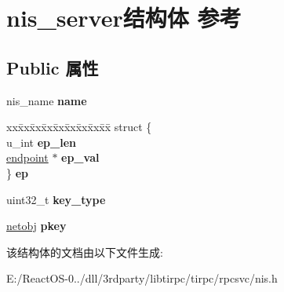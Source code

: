 \hypertarget{structnis__server}{}\section{nis\+\_\+server结构体 参考}
\label{structnis__server}
\subsection*{Public 属性}
\begin{DoxyCompactItemize}
\item 
\mbox{\label{structnis__server_ad0a723ac45ea66369ce09b6cb729c4ed}} 
nis\+\_\+name {\bfseries name}
\item 
\mbox{\label{structnis__server_a392a344888cf3b884c85b5b671d7b2d9}} 
\begin{tabbing}
xx\=xx\=xx\=xx\=xx\=xx\=xx\=xx\=xx\=\kill
struct \{\\
\>u\_int {\bfseries ep\_len}\\
\>\hyperlink{structendpoint}{endpoint} $\ast$ {\bfseries ep\_val}\\
\} {\bfseries ep}\\

\end{tabbing}\item 
\mbox{\label{structnis__server_a06609914e33ad4ca10f3ae3d272e9709}} 
uint32\+\_\+t {\bfseries key\+\_\+type}
\item 
\mbox{\label{structnis__server_a7a0462cb3c7045c6484e07b965988926}} 
\hyperlink{structnetobj}{netobj} {\bfseries pkey}
\end{DoxyCompactItemize}


该结构体的文档由以下文件生成\+:\begin{DoxyCompactItemize}
\item 
E\+:/\+React\+O\+S-\/0../dll/3rdparty/libtirpc/tirpc/rpcsvc/nis.\+h\end{DoxyCompactItemize}
